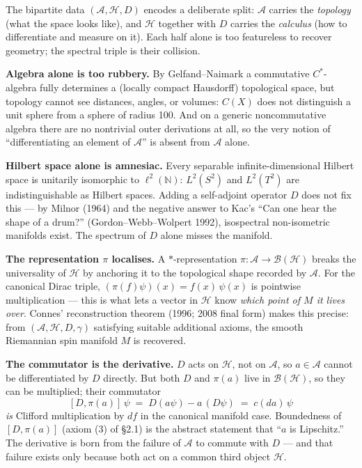 \documentclass[
  11pt,
]{article}
\begin{document}
The bipartite data \((\mathcal{A}, \mathcal{H}, D)\) encodes a
deliberate split: \(\mathcal{A}\) carries the \emph{topology} (what the
space looks like), and \(\mathcal{H}\) together with \(D\) carries the
\emph{calculus} (how to differentiate and measure on it). Each half
alone is too featureless to recover geometry; the spectral triple is
their collision.

\textbf{Algebra alone is too rubbery.} By Gelfand--Naimark a commutative
\(C^*\)-algebra fully determines a (locally compact Hausdorff)
topological space, but topology cannot see distances, angles, or
volumes: \(C(X)\) does not distinguish a unit sphere from a sphere of
radius 100. And on a generic noncommutative algebra there are no
nontrivial outer derivations at all, so the very notion of
``differentiating an element of \(\mathcal{A}\)'' is absent from
\(\mathcal{A}\) alone.

\textbf{Hilbert space alone is amnesiac.} Every separable
infinite-dimensional Hilbert space is unitarily isomorphic to
\(\ell^2(\mathbb{N})\): \(L^2(S^2)\) and \(L^2(T^2)\) are
indistinguishable as Hilbert spaces. Adding a self-adjoint operator
\(D\) does not fix this --- by Milnor (1964) and the negative answer to
Kac's ``Can one hear the shape of a drum?'' (Gordon--Webb--Wolpert
1992), isospectral non-isometric manifolds exist. The spectrum of \(D\)
alone misses the manifold.

\textbf{The representation \(\pi\) localises.} A \(*\)-representation
\(\pi\colon \mathcal{A}\to \mathcal{B}(\mathcal{H})\) breaks the
universality of \(\mathcal{H}\) by anchoring it to the topological shape
recorded by \(\mathcal{A}\). For the canonical Dirac triple,
\((\pi(f)\psi)(x) = f(x)\,\psi(x)\) is pointwise multiplication --- this
is what lets a vector in \(\mathcal{H}\) know \emph{which point of \(M\)
it lives over}. Connes' reconstruction theorem (1996; 2008 final form)
makes this precise: from \((\mathcal{A}, \mathcal{H}, D, \gamma)\)
satisfying suitable additional axioms, the smooth Riemannian spin
manifold \(M\) is recovered.

\textbf{The commutator is the derivative.} \(D\) acts on
\(\mathcal{H}\), not on \(\mathcal{A}\), so \(a \in \mathcal{A}\) cannot
be differentiated by \(D\) directly. But both \(D\) and \(\pi(a)\) live
in \(\mathcal{B}(\mathcal{H})\), so they can be multiplied; their
commutator \[
[D, \pi(a)]\,\psi \;=\; D(a\psi) - a\,(D\psi) \;=\; c(da)\,\psi
\] \emph{is} Clifford multiplication by \(df\) in the canonical manifold
case. Boundedness of \([D, \pi(a)]\) (axiom (3) of §2.1) is the abstract
statement that ``\(a\) is Lipschitz.'' The derivative is born from the
failure of \(\mathcal{A}\) to commute with \(D\) --- and that failure
exists only because both act on a common third object \(\mathcal{H}\).
\end{document}
